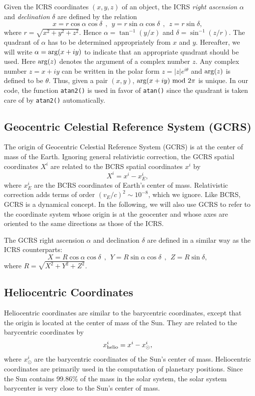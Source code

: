 \documentclass[12pt]{article}
\newcommand \beq {\begin{equation}}
\newcommand \eeq {\end{equation}}
\begin{document}
Given the ICRS coordinates $(x,y,z)$ of an object, the ICRS {\em right ascension} 
$\alpha$ and {\em declination} $\delta$ are defined by the relation 
\beq
  x = r \cos \alpha \cos \delta \ \ , \ \ 
  y = r \sin \alpha \cos \delta \ \ , \ \
  z = r \sin \delta ,
\eeq
where $r=\sqrt{x^2+y^2+z^2}$. Hence $\alpha = \tan^{-1} (y/x)$ and 
$\delta = \sin^{-1}(z/r)$. The quadrant of $\alpha$ has to be determined
appropriately from $x$ and $y$. Hereafter, we will write $\alpha = {\rm arg}(x+iy)$ 
to indicate that an appropriate quadrant should be used. Here ${\rm arg}(z)$ denotes 
the argument of a complex number $z$. Any complex number $z=x+iy$ can be written in 
the polar form $z=|z| e^{i\theta}$ and ${\rm arg}(z)$ is defined to be $\theta$. 
Thus, given a pair $(x,y)$, ${\rm arg}(x+iy)~{\rm mod}~2\pi$ is unique.
In our code, the function {\tt atan2()} is used in favor of {\tt atan()} 
since the quadrant is taken care of by {\tt atan2()} automatically.

\subsection{Geocentric Celestial Reference System (GCRS)}

The origin of Geocentric Celestial Reference System (GCRS) is at the 
center of mass of the Earth. 
Ignoring general relativistic correction, the GCRS spatial coordinates $X^i$ 
are related to the BCRS spatial coordinates $x^i$ by 
\beq
  X^i = x^i - x^i_E ,
\label{eq:GCRSX}
\eeq
where $x^i_E$ are the BCRS coordinates of Earth's center of mass. Relativistic 
correction adds terms of order $(v_E/c)^2 \sim 10^{-8}$, which we ignore. Like 
BCRS, GCRS is a dynamical concept. In the following, we will also use GCRS 
to refer to the coordinate system whose origin is at the geocenter and whose 
axes are oriented to the same directions as those of the ICRS.

The GCRS right ascension $\alpha$ and declination $\delta$ are defined in a
similar way as the ICRS counterparts:
\beq
  X = R \cos \alpha \cos \delta \ \ , \ \
  Y = R \sin \alpha \cos \delta \ \ , \ \
  Z = R \sin \delta ,
\label{eq:GCRScoord}
\eeq
where $R=\sqrt{X^2+Y^2+Z^2}$.

\subsection{Heliocentric Coordinates} 

Heliocentric coordinates are similar to the barycentric coordinates, 
except that the origin is located at the center of mass of the Sun. 
They are related to the barycentric coordinates by 
\beq
 x^i_{\rm helio} = x^i - x^i_{\odot} ,
\eeq
where $x^i_{\odot}$ are the barycentric coordinates of the Sun's center 
of mass. Heliocentric coordinates are primarily used in the computation 
of planetary positions. Since the Sun contains 99.86\% of the mass 
in the solar system, the solar system barycenter is very close to the 
Sun's center of mass.
\end{document}
